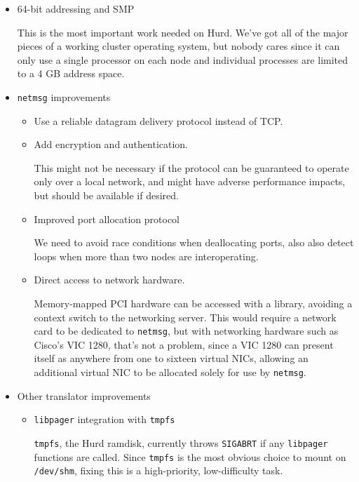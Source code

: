 \documentclass{article}
\def\libpager{{\tt libpager}\xspace}
\def\netmsg{{\tt netmsg}\xspace}
\begin{document}
\begin{itemize}

\item 64-bit addressing and SMP

This is the most important work needed on Hurd.  We've got all of the
major pieces of a working cluster operating system, but nobody cares
since it can only use a single processor on each node and individual
processes are limited to a 4 GB address space.

\item \netmsg improvements

\begin{itemize}

\item Use a reliable datagram delivery protocol instead of TCP.

\item Add encryption and authentication.

This might not be necessary if the protocol can be guaranteed to
operate only over a local network, and might have adverse performance
impacts, but should be available if desired.

\item Improved port allocation protocol

We need to avoid race conditions when deallocating ports, also also
detect loops when more than two nodes are interoperating.

\item Direct access to network hardware.

Memory-mapped PCI hardware can be accessed with a library, avoiding a
context switch to the networking server.  This would require a network
card to be dedicated to \netmsg, but with networking hardware such as
Cisco's VIC 1280, that's not a problem, since a VIC 1280 can
present itself as anywhere from one to sixteen virtual NICs, allowing
an additional virtual NIC to be allocated solely for use by \netmsg.

\end{itemize}

\item Other translator improvements

\begin{itemize}

\item \libpager integration with {\tt tmpfs}

{\tt tmpfs}, the Hurd ramdisk, currently throws {\tt SIGABRT} if any
\libpager functions are called.
Since {\tt tmpfs} is the most obvious choice to mount on
{\tt /dev/shm}, fixing this is a high-priority, low-difficulty task.


\end{itemize}
\end{itemize}
\end{document}
